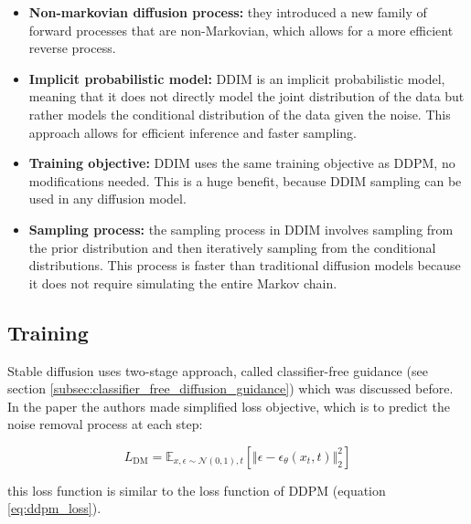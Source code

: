 \begin{itemize}
    \item \textbf{Non-markovian diffusion process:} they introduced a new family of forward processes that are non-Markovian, which allows for a more efficient reverse process.
    \item \textbf{Implicit probabilistic model:} DDIM is an implicit probabilistic model, meaning that it does not directly model the joint distribution of the data but rather models the conditional distribution of the data given the noise. This approach allows for efficient inference and faster sampling.
    \item \textbf{Training objective:} DDIM uses the same training objective as DDPM, no modifications needed. This is a huge benefit, because DDIM sampling can be used in any diffusion model.
    \item \textbf{Sampling process:} the sampling process in DDIM involves sampling from the prior distribution and then iteratively sampling from the conditional distributions. This process is faster than traditional diffusion models because it does not require simulating the entire Markov chain.
\end{itemize}
















\subsection{Training}

Stable diffusion uses two-stage approach, called classifier-free guidance (see section \ref{subsec:classifier_free_diffusion_guidance}) which was discussed before. In the paper the authors made simplified loss objective, which is to predict the noise removal process at each step:

\[
    L_{\text{DM}} = \mathbb{E}_{x, \epsilon \sim \mathcal{N} (0, 1), t} \left[ \Vert \epsilon - \epsilon_\theta(x_t, t) \Vert _2^2 \right]
\]

this loss function is similar to the loss function of DDPM (equation \ref{eq:ddpm_loss}).













